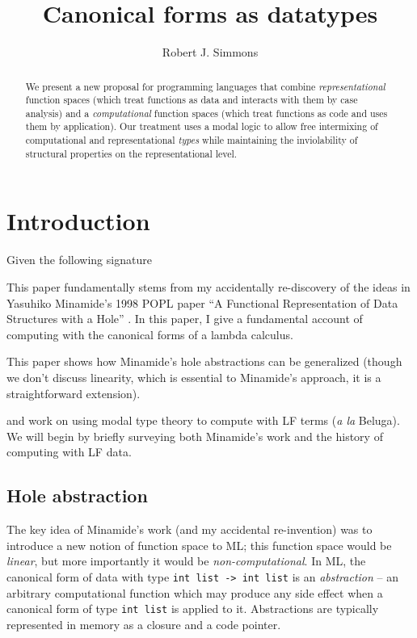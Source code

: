 \documentclass[twocolumn]{article}
\begin{document}
\title{Canonical forms as datatypes}
\author{Robert J. Simmons}
\maketitle

\begin{abstract}
We present a new proposal for programming languages that combine
{\it representational} function spaces (which treat functions as data
and interacts with them by case analysis) and a {\it computational} function
spaces (which treat functions as code and uses them by application).
Our treatment uses a modal logic to allow free intermixing
of computational and representational {\it types} while maintaining the
inviolability of structural properties on the representational level.
\end{abstract}

\section{Introduction}

Given the following signature

This paper fundamentally stems from my accidentally re-discovery of 
the ideas in
Yasuhiko Minamide's 1998 POPL paper ``A Functional Representation of 
Data Structures with a Hole'' \cite{minamide98functional}. In this paper,
I give a fundamental account of computing with the canonical
forms of a lambda calculus. 

This paper shows how Minamide's hole abstractions can be generalized
(though we don't discuss linearity, which is essential to Minamide's 
approach, it is a straightforward extension).


and work on using modal type theory to compute with LF terms
({\it a la} Beluga). We will begin by briefly surveying both Minamide's
work and the history of computing with LF data.

\subsection{Hole abstraction}

The key idea of
Minamide's work (and my accidental re-invention) was to introduce a new
notion of function space to ML; this function space would be {\it linear},
but more importantly it would be {\it non-computational}. In ML, the canonical 
form of data with type \texttt{int list -> int list} is
an {\it abstraction} -- an arbitrary computational function which may
produce any side effect when a canonical form of type \texttt{int list}
is applied to it. Abstractions are typically 
represented in memory as a closure and a code pointer.
\end{document}
